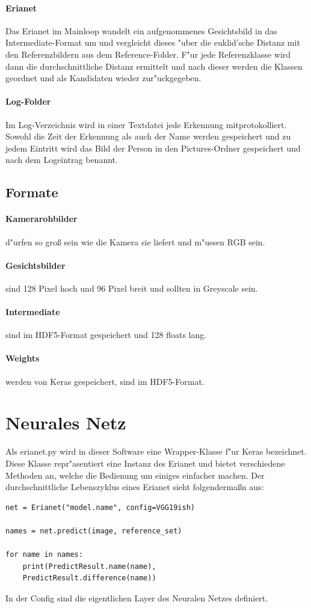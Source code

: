 \documentclass[12pt]{article}
\begin{document}
\paragraph{Erianet}
Das Erianet im Mainloop wandelt ein aufgenommenes Gesichtsbild in
das Intermediate-Format um und vergleicht dieses "uber die 
euklid'sche Distanz mit den Referenzbildern aus dem Reference-Folder.
F"ur jede Referenzklasse wird dann die durchschnittliche Distanz
ermittelt und nach dieser werden die Klassen geordnet und als
Kandidaten wieder zur"uckgegeben.
\paragraph{Log-Folder}
Im Log-Verzeichnis wird in einer Textdatei jede Erkennung mitprotokolliert.
Sowohl die Zeit der Erkennung als auch der Name werden gespeichert und zu
jedem Eintritt wird das Bild der Person in den Pictures-Ordner gespeichert
und nach dem Logeintrag benannt.
\subsection{Formate}
\paragraph{Kamerarohbilder}
d"urfen so gro{\ss} sein wie die Kamera sie liefert und m"ussen RGB sein.
\paragraph{Gesichtsbilder}
sind 128 Pixel hoch und 96 Pixel breit und sollten in Greyscale 
sein.
\paragraph{Intermediate}
sind im HDF5-Format gespeichert und 128 floats lang.
\paragraph{Weights}
werden von Keras gespeichert, sind im HDF5-Format. 
\label{formats}
\pagebreak
\section{Neurales Netz}
Als erianet.py wird in dieser Software eine Wrapper-Klasse f"ur 
Keras bezeichnet. Diese Klasse repr"asentiert eine Instanz des 
Erianet und bietet verschiedene Methoden an, welche die 
Bedienung um einiges einfacher machen. Der durchschnittliche
Lebenszyklus eines Erianet sieht folgenderma{\ss}n aus:
\begin{lstlisting}[frame=single]
net = Erianet("model.name", config=VGG19ish)

names = net.predict(image, reference_set)

for name in names:
    print(PredictResult.name(name), 
    PredictResult.difference(name))
\end{lstlisting}
In der Config sind die eigentlichen Layer des Neuralen Netzes definiert.
\end{document}
